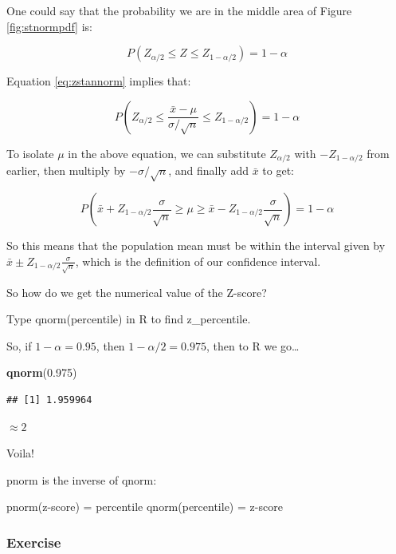 \documentclass[
  openany]{book}
\newenvironment{Shaded}{\begin{snugshade}}{\end{snugshade}}
\newcommand{\FloatTok}[1]{\textcolor[rgb]{0.00,0.00,0.81}{#1}}
\newcommand{\FunctionTok}[1]{\textcolor[rgb]{0.13,0.29,0.53}{\textbf{#1}}}
\newcommand{\NormalTok}[1]{#1}
\begin{document}
One could say that the probability we are in the middle area of Figure \ref{fig:stnormpdf} is:

\begin{equation}
P(Z_{\alpha/2}\le Z\le Z_{1-\alpha/2})=1-\alpha
\end{equation}

Equation \eqref{eq:zstannorm} implies that:

\begin{equation}
P(Z_{\alpha/2}\le \frac{\bar{x}-\mu}{\sigma/\sqrt{n}}\le Z_{1-\alpha/2})=1-\alpha
\end{equation}

To isolate \(\mu\) in the above equation, we can substitute \(Z_{\alpha/2}\) with \(-Z_{1-\alpha/2}\) from earlier, then multiply by \(-\sigma/\sqrt{n}\), and finally add \(\bar{x}\) to get:

\begin{equation}
P(\bar{x}+Z_{1-\alpha/2}\frac{\sigma}{\sqrt{n}}\ge \mu \ge \bar{x}-Z_{1-\alpha/2}\frac{\sigma}{\sqrt{n}}) = 1-\alpha
\label{eq:moederived}
\end{equation}

So this means that the population mean must be within the interval given by \(\bar{x}\pm Z_{1-\alpha/2}\frac{\sigma}{\sqrt{n}}\), which is the definition of our confidence interval.

So how do we get the numerical value of the Z-score?

Type qnorm(percentile) in R to find z\_percentile.

So, if \(1-\alpha = 0.95\), then \(1-\alpha/2 = 0.975\), then to R we go\ldots{}

\begin{Shaded}
\begin{Highlighting}[]
\FunctionTok{qnorm}\NormalTok{(}\FloatTok{0.975}\NormalTok{)}
\end{Highlighting}
\end{Shaded}

\begin{verbatim}
## [1] 1.959964
\end{verbatim}

\(\approx 2\)

Voila!

pnorm is the inverse of qnorm:

pnorm(z-score) = percentile qnorm(percentile) = z-score

\subsubsection{Exercise}\label{exercise}
\end{document}
